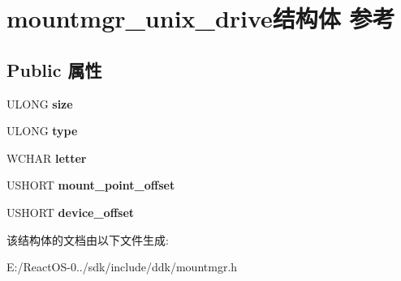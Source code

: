 \hypertarget{structmountmgr__unix__drive}{}\section{mountmgr\+\_\+unix\+\_\+drive结构体 参考}
\label{structmountmgr__unix__drive}
\subsection*{Public 属性}
\begin{DoxyCompactItemize}
\item 
\mbox{\label{structmountmgr__unix__drive_a37e5cf9eb0855c208d974a93ae6b410b}} 
U\+L\+O\+NG {\bfseries size}
\item 
\mbox{\label{structmountmgr__unix__drive_a978b8addb3f0b2a76537de77a02a2c92}} 
U\+L\+O\+NG {\bfseries type}
\item 
\mbox{\label{structmountmgr__unix__drive_aede7f8386ac6042410c9474f7d354d3a}} 
W\+C\+H\+AR {\bfseries letter}
\item 
\mbox{\label{structmountmgr__unix__drive_afdb6e285f56a322bc58ee4af6198fb30}} 
U\+S\+H\+O\+RT {\bfseries mount\+\_\+point\+\_\+offset}
\item 
\mbox{\label{structmountmgr__unix__drive_a2b8fd33839a0c1d8a6a0857cecd6e4e7}} 
U\+S\+H\+O\+RT {\bfseries device\+\_\+offset}
\end{DoxyCompactItemize}


该结构体的文档由以下文件生成\+:\begin{DoxyCompactItemize}
\item 
E\+:/\+React\+O\+S-\/0../sdk/include/ddk/mountmgr.\+h\end{DoxyCompactItemize}
